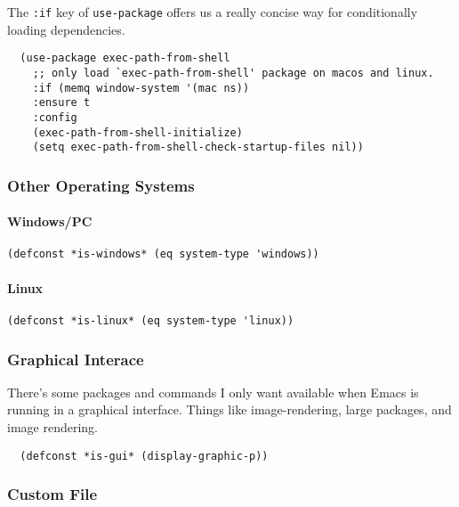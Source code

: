 \documentclass[11pt]{article}
\begin{document}
The \texttt{:if} key of \texttt{use-package} offers us a really concise way for
conditionally loading dependencies.

\begin{verbatim}
  (use-package exec-path-from-shell
    ;; only load `exec-path-from-shell' package on macos and linux.
    :if (memq window-system '(mac ns))
    :ensure t
    :config
    (exec-path-from-shell-initialize)
    (setq exec-path-from-shell-check-startup-files nil))
\end{verbatim}

\subsubsection*{Other Operating Systems}
\label{sec:org721816e}
\paragraph*{Windows/PC}
\label{sec:org29ce3ee}

\begin{verbatim}
(defconst *is-windows* (eq system-type 'windows))
\end{verbatim}

\paragraph*{Linux}
\label{sec:orgff1a639}

\begin{verbatim}
(defconst *is-linux* (eq system-type 'linux))
\end{verbatim}

\subsubsection*{Graphical Interace}
\label{sec:org56a0112}

There's some packages and commands I only want available when Emacs is
running in a graphical interface. Things like image-rendering, large
packages, and image rendering.

\begin{verbatim}
  (defconst *is-gui* (display-graphic-p))
\end{verbatim}

\subsubsection*{Custom File}
\label{sec:org90421c4}
\end{document}
